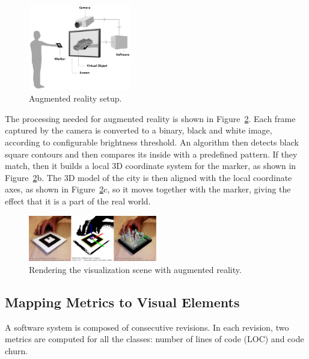 \begin{figure}[h!]
 \centering
 \includegraphics[width=0.4\textwidth, bb=0 0 486 406]{./images/howtowork.jpg}
 \caption{Augmented reality setup.}
 \label{fig:setup}
\end{figure}

The processing needed for augmented reality is shown in Figure~\ref{fig:rendering_visualization}. Each frame captured by the camera is converted to a binary, black and white image, according to configurable brightness threshold. An algorithm then detects black square contours and then compares its inside with a predefined pattern. If they match, then it builds a local 3D coordinate system for the marker, as shown in Figure~\ref{fig:rendering_visualization}b. The 3D model of the city is then aligned with the local coordinate axes, as shown in Figure~\ref{fig:rendering_visualization}c, so it moves together with the marker, giving the effect that it is a part of the real world.

\begin{figure}[ht!]
 \centering
 \includegraphics[width=0.5\textwidth, bb=14 14 1343 490]{./images/visualizationRedering}
 \caption{Rendering the visualization scene with augmented reality.}
 \label{fig:rendering_visualization}
\end{figure}

\subsection{Mapping Metrics to Visual Elements} \label{sec:metrics_visual_elements}
A software system is composed of consecutive revisions. In each revision, two metrics are computed for all the classes: number of lines of code (LOC) and code churn. 

